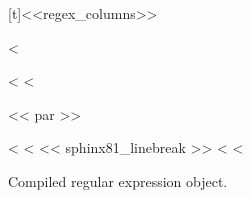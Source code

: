 \documentclass[letterpaper,10pt,english]{sphinxmanual}
\begin{document}
\begin{fulllineitems}
\begin{savenotes}
\begin{tabulary}{\linewidth}[t]{<<regex_columns>>}
\begin{varwidth}[t]{}
<%
\end{varwidth}%
<%
<%
\end{tabulary}
<< par >>
\sphinxattableend\end{savenotes}

\end{fulllineitems}


\vspace{5px}

\begin{fulllineitems}
\label{\detokenize{regex:tests.regex_demo.one_flag}}
<%
\pysigstartsignatures
<%
\pysigline<< sphinx81_linebreak >>{}
<%
\pysigstopsignatures
<%
    

Compiled regular expression object.



\end{fulllineitems}
\end{document}

